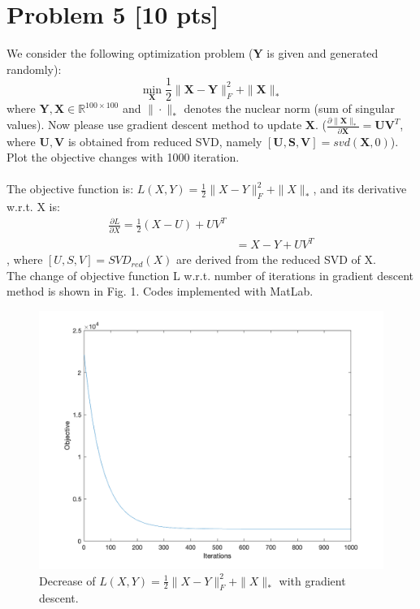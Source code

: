 \documentclass[11pt]{article}
\newcommand{\R}{\mathbb{R}}
\newcommand{\mtx}[1]{\mathbf{#1}}
\def \mU {\mtx{U}}
\def \mS {\mtx{S}}
\def \mV {\mtx{V}}
\def \mX {\mtx{X}}
\def \mY {\mtx{Y}}
\def \R {\mathbb{R}}
\begin{document}
\newpage
\section*{Problem 5 [10 pts]}
We consider the following optimization problem ($\mY$ is given and generated randomly):
\begin{equation}
	\min_{\mX} \frac{1}{2}\|\mX-\mY\|^2_F + \|\mX\|_*
\end{equation}
where $\mY,\mX\in\R^{100\times100}$ and $\|\cdot\|_*$ denotes the nuclear norm (sum of singular values). Now please use gradient descent method to update $\mX$. ($\frac{\partial \|\mX\|_*}{\partial \mX}=\mU\mV^T$, where $\mU,\mV$ is obtained from reduced SVD, namely $[\mU,\mS,\mV]=svd(\mX,0)$). Plot the objective changes with 1000 iteration.\\ \\
The objective function is: $L(X,Y) = \frac{1}{2}\|X-Y\|_F^2+\|X\|_*$, and its derivative w.r.t. X is: 
\begin{equation}
	\begin{aligned}
		\frac{\partial L}{\partial X} = \frac{1}{2}(X-U) + UV^T\\
		& = X-Y+UV^T
	\end{aligned}
\end{equation}
, where $[U,S,V]=SVD_{red}(X)$ are derived from the reduced SVD of X.\\
The change of objective function L w.r.t. number of iterations in gradient descent method is shown in Fig. 1. Codes implemented with MatLab.
\begin{figure}[H] %
	\centering\includegraphics[width=0.8\linewidth]{fin_5.png}
	\caption{Decrease of $L(X,Y) = \frac{1}{2}\|X-Y\|_F^2+\|X\|_*$ with gradient descent.} %
	\label{fig:fig6}  %
\end{figure}
\end{document}
